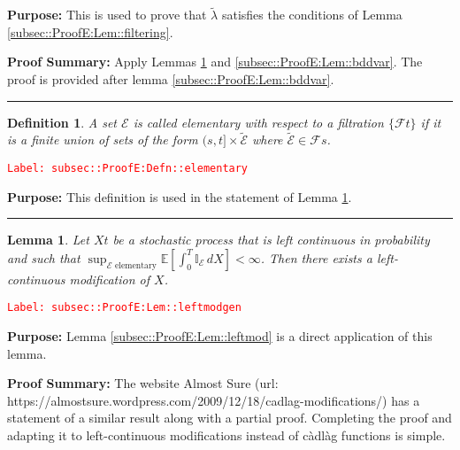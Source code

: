 \documentclass[12pt]{article}
\newcommand{\mb}{\mathbb}
\newcommand{\mc}{\mathcal}
\newcommand{\te}{\text}
\newcommand{\tr}{\textcolor{red}}
\newcommand{\labe}[1]{\tr{\texttt{Label: #1}}}
\newcommand{\purpose}{\textbf{Purpose: }}
\newcommand{\pfsum}{\textbf{Proof Summary: }}
\newcommand{\lin}{\rule{\linewidth}{0.4 pt}}
\newcommand{\ex}[1]{\mb{E}\left[#1\right]}			%
\newcommand{\T}{T}								%
\renewcommand{\t}{t}							%
\renewcommand{\tt}{s}							%
\newcommand{\F}{\mc{F}}							%
\newcommand{\X}{X}								%
\newcommand{\alt}[1]{\widetilde{#1}}			%
\newcommand{\evnt}{\mc{E}}						%
\newcommand{\crate}{\alt{\lambda}}				%
\newtheorem{lem}[thms]{Lemma}
\newtheorem{defn}[thms]{Definition}
\begin{document}
\purpose This is used to prove that \(\crate{}{}\) satisfies the conditions of Lemma \ref{subsec::ProofE:Lem::filtering}.

\pfsum Apply Lemmas \ref{subsec::ProofE:Lem::leftmodgen} and \ref{subsec::ProofE:Lem::bddvar}. The proof is provided after lemma \ref{subsec::ProofE:Lem::bddvar}.

\lin

\begin{defn}
A set \(\evnt\) is called elementary with respect to a filtration \(\{\F{}{\t}\}\) if it is a finite union of sets of the form \((\tt,\t]\times \alt{\evnt}\) where \(\alt{\evnt} \in \F{}{\tt}\).
\label{subsec::ProofE:Defn::elementary}
\end{defn}
\labe{subsec::ProofE:Defn::elementary}

\purpose This definition is used in the statement of Lemma \ref{subsec::ProofE:Lem::leftmodgen}.

\lin

\begin{lem}
Let \(\X{}{\t}\) be a stochastic process that is left continuous in probability and such that \(\sup_{\evnt\te{ elementary}}\ex{\int_0^\T \mb{I}_\evnt\,d\X{}{}} < \infty\). Then there exists a left-continuous modification of \(\X{}{}\).
\label{subsec::ProofE:Lem::leftmodgen}
\end{lem}
\labe{subsec::ProofE:Lem::leftmodgen}

\purpose Lemma \ref{subsec::ProofE:Lem::leftmod} is a direct application of this lemma.

\pfsum The website Almost Sure (url: https://almostsure.wordpress.com/2009/12/18/cadlag-modifications/) has a statement of a similar result along with a partial proof. Completing the proof and adapting it to left-continuous modifications instead of c\`adl\`ag functions is simple.
\end{document}
